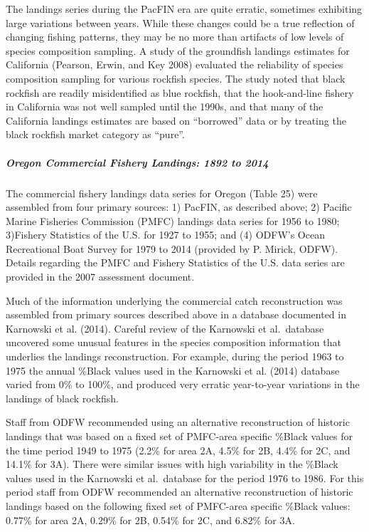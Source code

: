\documentclass[11pt,
  english,
  letterpaper,
]{article}
\begin{document}
The landings series during the PacFIN era are quite erratic, sometimes exhibiting large variations between years. While these changes could be a true reflection of changing fishing patterns, they may be no more than artifacts of low levels of species composition sampling. A study of the groundfish landings estimates for California (Pearson, Erwin, and Key 2008) evaluated the reliability of species composition sampling for various rockfish species. The study noted that black rockfish are readily misidentified as blue rockfish, that the hook-and-line fishery in California was not well sampled until the 1990s, and that many of the California landings estimates are based on ``borrowed'' data or by treating the black rockfish market category as ``pure''.

\hypertarget{oregon-commercial-fishery-landings-1892-to-2014}{%
\subparagraph{Oregon Commercial Fishery Landings: 1892 to 2014}\label{oregon-commercial-fishery-landings-1892-to-2014}}

The commercial fishery landings data series for Oregon (Table 25) were assembled from four primary sources: 1) PacFIN, as described above; 2) Pacific Marine Fisheries Commission (PMFC) landings data series for 1956 to 1980; 3)Fishery Statistics of the U.S. for 1927 to 1955; and (4) ODFW's Ocean Recreational Boat Survey for 1979 to 2014 (provided by P. Mirick, ODFW). Details regarding the PMFC and Fishery Statistics of the U.S. data series are provided in the 2007 assessment document.

Much of the information underlying the commercial catch reconstruction was assembled from primary sources described above in a database documented in Karnowski et al. (2014). Careful review of the Karnowski et al.~database uncovered some unusual features in the species composition information that underlies the landings reconstruction. For example, during the period 1963 to 1975 the annual \%Black values used in the Karnowski et al. (2014) database varied from 0\% to 100\%, and produced very erratic year-to-year variations in the landings of black rockfish.

Staff from ODFW recommended using an alternative reconstruction of historic landings that was based on a fixed set of PMFC-area specific \%Black values for the time period 1949 to 1975 (2.2\% for area 2A, 4.5\% for 2B, 4.4\% for 2C, and 14.1\% for 3A). There were similar issues with high variability in the \%Black values used in the Karnowski et al.~database for the period 1976 to 1986. For this period staff from ODFW recommended an alternative reconstruction of historic landings based on the following fixed set of PMFC-area specific \%Black values: 0.77\% for area 2A, 0.29\% for 2B, 0.54\% for 2C, and 6.82\% for 3A.
\end{document}
